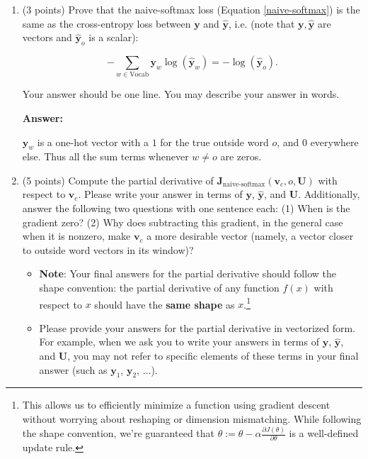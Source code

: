 \documentclass{article}
\newenvironment{answer}{
    {\bf Answer:} \sf \begingroup\color{red}
}{\endgroup}%
\begin{document}
\clearpage 
\begin{enumerate}[label=(\alph*)]
\item (3 points) 
Prove that the naive-softmax loss (Equation \ref{naive-softmax}) is the same as the cross-entropy loss between $\bm y$ and $\hat{\bm y}$, i.e. (note that $\bm y, \hat{\bm y}$ are vectors and $\hat{\bm y}_o$ is a scalar):

\begin{equation} 
-\sum_{w \in \text{Vocab}} \bm y_w \log(\hat{\bm y}_w) = - \log (\hat{\bm y}_o).
\end{equation}

Your answer should be one line. You may describe your answer in words.
\begin{shaded}
\begin{answer}
$\mathbf{y}_w$ is a one-hot vector with a $1$ for the true outside word $o$, and $0$ everywhere else. Thus all the sum terms whenever $w\ne o$ are zeros.
\end{answer}
\end{shaded}

\item (5 points) Compute the partial derivative of $\bm J_{\text{naive-softmax}}(\bm v_c, o, \bm U)$ with respect to $\bm v_c$. Please write your answer in terms of $\bm y$, $\hat{\bm y}$, and $\bm U$. Additionally, answer the following two questions with one sentence each: (1) When is the gradient zero? (2) Why does subtracting this gradient, in the general case when it is nonzero, make $\bm v_c$ a more desirable vector (namely, a vector closer to outside word vectors in its window)?

\begin{itemize} 
\item \textbf{Note}: Your final answers for the partial derivative should follow the shape convention: the partial derivative of any function $f(x)$ with respect to $x$ should have the \textbf{same shape} as $x$.\footnote{This allows us to efficiently minimize a function using gradient descent without worrying about reshaping or dimension mismatching. While following the shape convention, we're guaranteed that $\theta:= \theta - \alpha\frac{\partial J(\theta)}{\partial \theta}$ is a well-defined update rule.}
\item Please provide your answers for the partial derivative in vectorized form. For example, when we ask you to write your answers in terms of $\bm y$, $\hat{\bm y}$, and $\bm U$, you may not refer to specific elements of these terms in your final answer (such as $\bm y_1$, $\bm y_2$, $\dots$). 
\end{itemize}




\end{enumerate}
\end{document}
